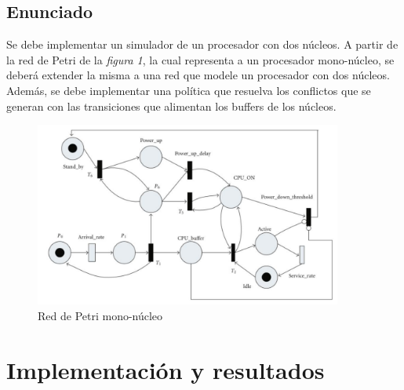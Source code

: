 \documentclass{article}
\begin{document}
    \subsection{Enunciado}
    Se debe implementar un simulador de un procesador con dos núcleos. A partir de la red de
    Petri de la \emph{figura 1}, la cual representa a un procesador mono-núcleo, se deberá 
    extender la misma a una red que modele un procesador con dos núcleos. Además, se debe
    implementar una política que resuelva los conflictos que se generan con las transiciones
    que alimentan los buffers de los núcleos.
    \begin{figure}[h]
        \includegraphics[width=0.9\textwidth, center]{rdp_enun.png}
        \caption{Red de Petri mono-núcleo}
    \end{figure} \newpage
    \section{Implementación y resultados}
\end{document}
